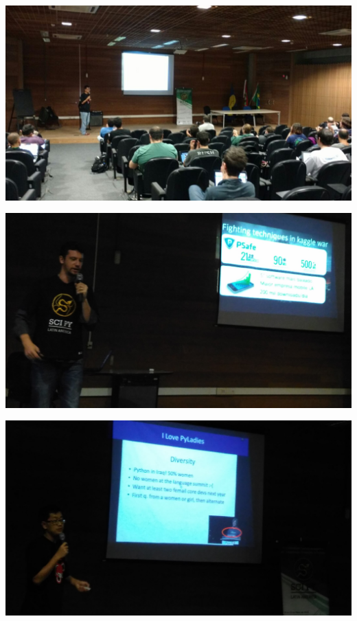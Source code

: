 \documentclass[12pt]{article}
\begin{document}
\noindent  %
\includegraphics[width=\textwidth]{talks-full.jpg}

\noindent  %
\includegraphics[width=\textwidth]{talks-kaggle.jpg}

\noindent  %
\includegraphics[width=\textwidth]{talks-pyladies.jpg}
\end{document}
